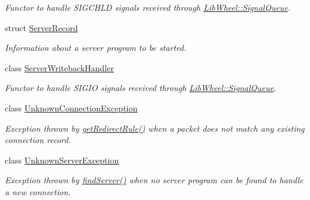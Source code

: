 \begin{DoxyCompactItemize}
\begin{DoxyCompactList}\small\item\em \-Functor to handle \-S\-I\-G\-C\-H\-L\-D signals received through \hyperlink{classLibWheel_1_1SignalQueue}{\-Lib\-Wheel\-::\-Signal\-Queue}. \end{DoxyCompactList}\item 
struct \hyperlink{structNERD_1_1ConnectionServer_1_1ServerRecord}{\-Server\-Record}
\begin{DoxyCompactList}\small\item\em \-Information about a server program to be started. \end{DoxyCompactList}\item 
class \hyperlink{classNERD_1_1ConnectionServer_1_1ServerWritebackHandler}{\-Server\-Writeback\-Handler}
\begin{DoxyCompactList}\small\item\em \-Functor to handle \-S\-I\-G\-I\-O signals received through \hyperlink{classLibWheel_1_1SignalQueue}{\-Lib\-Wheel\-::\-Signal\-Queue}. \end{DoxyCompactList}\item 
class \hyperlink{classNERD_1_1ConnectionServer_1_1UnknownConnectionException}{\-Unknown\-Connection\-Exception}
\begin{DoxyCompactList}\small\item\em \-Exception thrown by \hyperlink{classNERD_1_1ConnectionServer_afd85b7ad69696355650a0177d01f0a06}{get\-Redirect\-Rule()} when a packet does not match any existing connection record. \end{DoxyCompactList}\item 
class \hyperlink{classNERD_1_1ConnectionServer_1_1UnknownServerException}{\-Unknown\-Server\-Exception}
\begin{DoxyCompactList}\small\item\em \-Exception thrown by \hyperlink{classNERD_1_1ConnectionServer_a9d75b0d048d374095c4d7c96e4add7f8}{find\-Server()} when no server program can be found to handle a new connection. \end{DoxyCompactList}\end{DoxyCompactItemize}
